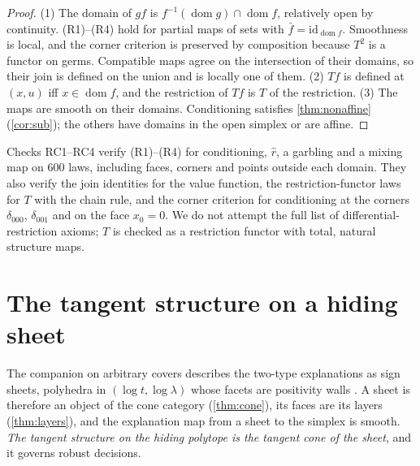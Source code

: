 \documentclass[11pt]{article}
\theoremstyle{definition}\newtheorem{definition}[theorem]{Definition}\newtheorem{remark}[theorem]{Remark}\newtheorem{example}[theorem]{Example}
\begin{document}
\begin{proof}
(1) The domain of $gf$ is $f^{-1}(\operatorname{dom}g)\cap\operatorname{dom}f$, relatively open by continuity. (R1)--(R4) hold for partial maps
of sets with $\bar f=\mathrm{id}_{\operatorname{dom}f}$. Smoothness is local, and the corner criterion is preserved by composition because $T^2$
is a functor on germs. Compatible maps agree on the intersection of their domains, so their join is defined on the union and is locally one
of them. (2) $Tf$ is defined at $(x,u)$ iff $x\in\operatorname{dom}f$, and the restriction of $Tf$ is $T$ of the restriction. (3) The maps are
smooth on their domains. Conditioning satisfies \cref{thm:nonaffine} (\cref{cor:sub}); the others have domains in the open simplex or are
affine.
\end{proof}

Checks RC1--RC4 verify (R1)--(R4) for conditioning, $\hat r$, a garbling and a mixing map on $600$ laws, including faces, corners and
points outside each domain. They also verify the join identities for the value function, the restriction-functor laws for $T$ with the
chain rule, and the corner criterion for conditioning at the corners $\delta_{000}$, $\delta_{001}$ and on the face $x_0=0$. We do not
attempt the full list of differential-restriction axioms; $T$ is checked as a restriction functor with total, natural structure maps.

\section{The tangent structure on a hiding sheet}\label{sec:sheets}
The companion on arbitrary covers describes the two-type explanations as sign sheets, polyhedra in $(\log t,\log\lambda)$ whose facets
are positivity walls \cite[Theorem 5]{Covers}. A sheet is therefore an object of the cone category (\cref{thm:cone}), its faces are its
layers (\cref{thm:layers}), and the explanation map from a sheet to the simplex is smooth. \emph{The tangent structure on the hiding
polytope is the tangent cone of the sheet}, and it governs robust decisions.
\end{document}
